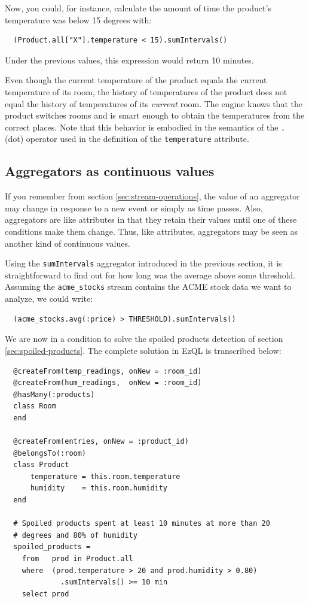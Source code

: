 \documentclass{report}
\begin{document}
Now, you could, for instance, calculate the amount of time the
product's temperature was below 15 degrees with:

\begin{lstlisting}
  (Product.all["X"].temperature < 15).sumIntervals()
\end{lstlisting}

Under the previous values, this expression would return 10 minutes.

Even though the current temperature of the product equals the current
temperature of its room, the history of temperatures of the product
does not equal the history of temperatures of its \emph{current}
room. The engine knows that the product switches rooms and is smart
enough to obtain the temperatures from the correct places. Note that
this behavior is embodied in the semantics of the \verb=.= (dot)
operator used in the definition of the \verb=temperature=
attribute.

\subsection{Aggregators as continuous values}
\label{sec:aggregators-continuous-values}

If you remember from section \ref{sec:stream-operations}, the value of
an aggregator may change in response to a new event or simply as time
passes. Also, aggregators are like attributes in that they retain
their values until one of these conditions make them change. Thus,
like attributes, aggregators may be seen as another kind of continuous
values.

Using the \verb=sumIntervals= aggregator introduced in the previous
section, it is straightforward to find out for how long was the
average above some threshold. Assuming the \verb=acme_stocks= stream
contains the ACME stock data we want to analyze, we could write:

\begin{lstlisting}
  (acme_stocks.avg(:price) > THRESHOLD).sumIntervals()
\end{lstlisting}


We are now in a condition to solve the spoiled products detection of
section \ref{sec:spoiled-products}. The complete solution in EzQL is
transcribed below:


\begin{lstlisting}
  @createFrom(temp_readings, onNew = :room_id)
  @createFrom(hum_readings,  onNew = :room_id)
  @hasMany(:products)
  class Room
  end

  @createFrom(entries, onNew = :product_id)
  @belongsTo(:room)
  class Product
      temperature = this.room.temperature
      humidity    = this.room.humidity
  end

  # Spoiled products spent at least 10 minutes at more than 20
  # degrees and 80% of humidity
  spoiled_products =
    from   prod in Product.all
    where  (prod.temperature > 20 and prod.humidity > 0.80)
             .sumIntervals() >= 10 min
    select prod
\end{lstlisting}
\end{document}

